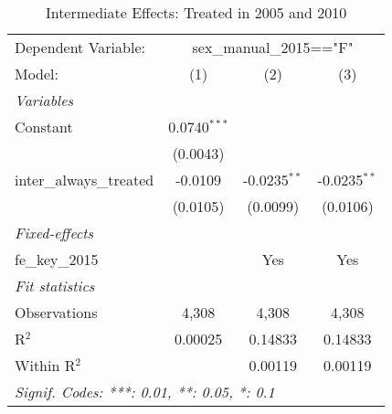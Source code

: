 
\begin{table}[htbp]
   \caption{Intermediate Effects: Treated in 2005 and 2010}
   \centering
   \begin{tabular}{lccc}
      \tabularnewline \midrule \midrule
      Dependent Variable: & \multicolumn{3}{c}{sex\_manual\_2015=="F"}\\
      Model:                   & (1)            & (2)            & (3)\\  
      \midrule
      \emph{Variables}\\
      Constant                 & 0.0740$^{***}$ &                &   \\   
                               & (0.0043)       &                &   \\   
      inter\_always\_treated   & -0.0109        & -0.0235$^{**}$ & -0.0235$^{**}$\\   
                               & (0.0105)       & (0.0099)       & (0.0106)\\   
      \midrule
      \emph{Fixed-effects}\\
      fe\_key\_2015            &                & Yes            & Yes\\  
      \midrule
      \emph{Fit statistics}\\
      Observations             & 4,308          & 4,308          & 4,308\\  
      R$^2$                    & 0.00025        & 0.14833        & 0.14833\\  
      Within R$^2$             &                & 0.00119        & 0.00119\\  
      \midrule \midrule
      \multicolumn{4}{l}{\emph{Signif. Codes: ***: 0.01, **: 0.05, *: 0.1}}\\
   \end{tabular}
\end{table}


